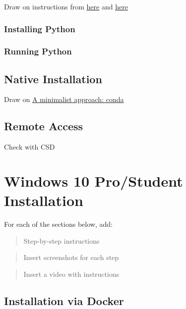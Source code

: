 \documentclass[
]{book}
\begin{document}
Draw on instructions from \href{https://gdsl-ul.github.io/the_knowledge/docker.html}{here} and \href{https://darribas.org/gds_env/guides/docker_install/}{here}

\hypertarget{installing-python}{%
\subsection{Installing Python}\label{installing-python}}

\hypertarget{running-python}{%
\subsection{Running Python}\label{running-python}}

\hypertarget{native-installation}{%
\section{Native Installation}\label{native-installation}}

Draw on \href{http://darribas.org/gds19/software.html}{A minimalist approach: conda}

\hypertarget{remote-access}{%
\section{Remote Access}\label{remote-access}}

Check with CSD

\hypertarget{win10pro}{%
\chapter{Windows 10 Pro/Student Installation}\label{win10pro}}

For each of the sections below, add:

\begin{quote}
Step-by-step instructions
\end{quote}

\begin{quote}
Insert screenshots for each step
\end{quote}

\begin{quote}
Insert a video with instructions
\end{quote}

\hypertarget{installation-via-docker}{%
\section{Installation via Docker}\label{installation-via-docker}}
\end{document}
